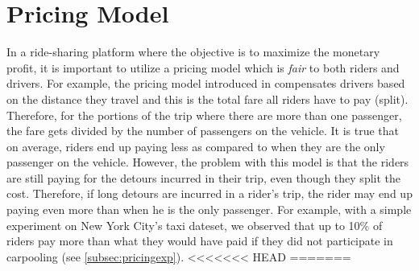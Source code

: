 \vspace{-3mm}
\section{Pricing Model}
\label{sec:pricing}


In a ride-sharing platform where the objective is to maximize the monetary profit, it is important to utilize a pricing model which is \textit{fair} to both riders and drivers. For example, the pricing model introduced in \cite{Ma13} compensates drivers based on the distance they travel and this is the total fare all riders have to pay (split). Therefore, for the portions of the trip where there are more than one passenger, the fare gets divided by the number of passengers on the vehicle. It is true that on average, riders end up paying less as compared to when they are the only passenger on the vehicle. However, the problem with this model is that the riders are still paying for the detours incurred in their trip, even though they split the cost. Therefore, if long detours are incurred in a rider's trip, the rider may end up paying even more than when he is the only passenger. For example, with a simple experiment on New York City's taxi dateset, we observed that up to 10\% of riders pay more than what they would have paid if they did not participate in carpooling (see \cref{subsec:pricingexp}).
<<<<<<< HEAD
=======


